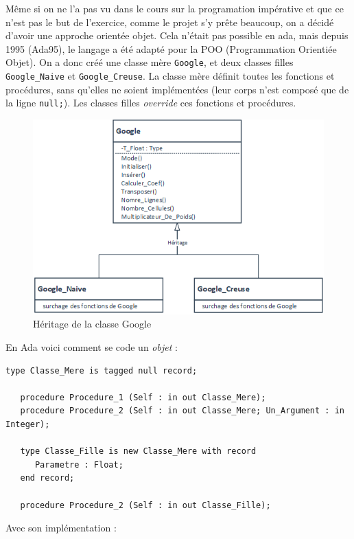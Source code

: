 Même si on ne l'a pas vu dans le cours sur la programation impérative et que ce n'est pas le but de l'exercice, comme le projet s'y prête beaucoup, on a décidé d'avoir une approche orientée objet.
Cela n'était pas possible en ada, mais depuis 1995 (Ada95), le langage a été adapté pour la POO (Programmation Orientiée Objet). On a donc créé une classe mère \lstinline{Google}, et deux classes filles \lstinline{Google_Naive} et \lstinline{Google_Creuse}. La classe mère définit toutes les fonctions et procédures, sans qu'elles ne soient implémentées (leur corps n'est composé que de la ligne \lstinline{null;}).
Les classes filles \textit{override} ces fonctions et procédures.
\begin{figure}[ht!]
   \centering
   \includegraphics[scale=0.5]{partie-2/sous-partie-3/heritage.png}
   \caption{Héritage de la classe Google \label{fig : heritage_projet}}
\end{figure} 
En Ada voici comment se code un \textit{objet} :

\begin{lstlisting}[caption={POO en Ada - Définition}, label={poo-ada-def}]
   type Classe_Mere is tagged null record;

   procedure Procedure_1 (Self : in out Classe_Mere);
   procedure Procedure_2 (Self : in out Classe_Mere; Un_Argument : in Integer);

   type Classe_Fille is new Classe_Mere with record
      Parametre : Float;
   end record;

   procedure Procedure_2 (Self : in out Classe_Fille);
\end{lstlisting}

Avec son implémentation :


